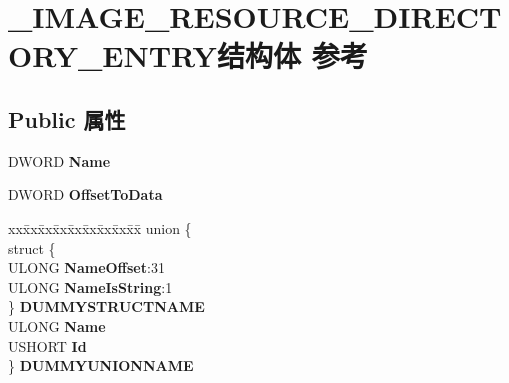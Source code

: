 \hypertarget{struct___i_m_a_g_e___r_e_s_o_u_r_c_e___d_i_r_e_c_t_o_r_y___e_n_t_r_y}{}\section{\+\_\+\+I\+M\+A\+G\+E\+\_\+\+R\+E\+S\+O\+U\+R\+C\+E\+\_\+\+D\+I\+R\+E\+C\+T\+O\+R\+Y\+\_\+\+E\+N\+T\+R\+Y结构体 参考}
\label{struct___i_m_a_g_e___r_e_s_o_u_r_c_e___d_i_r_e_c_t_o_r_y___e_n_t_r_y}
\subsection*{Public 属性}
\begin{DoxyCompactItemize}
\item 
\mbox{\label{struct___i_m_a_g_e___r_e_s_o_u_r_c_e___d_i_r_e_c_t_o_r_y___e_n_t_r_y_ad22f8c3d4789a1c9855d23a72243504e}} 
D\+W\+O\+RD {\bfseries Name}
\item 
\mbox{\label{struct___i_m_a_g_e___r_e_s_o_u_r_c_e___d_i_r_e_c_t_o_r_y___e_n_t_r_y_a3a4cd9e34d34c8cc2a6eb613fde7509a}} 
D\+W\+O\+RD {\bfseries Offset\+To\+Data}
\item 
\mbox{\label{struct___i_m_a_g_e___r_e_s_o_u_r_c_e___d_i_r_e_c_t_o_r_y___e_n_t_r_y_ac9631ba0261ffad2d16caf9e37be80c1}} 
\begin{tabbing}
xx\=xx\=xx\=xx\=xx\=xx\=xx\=xx\=xx\=\kill
union \{\\
\>struct \{\\
\>\>ULONG {\bfseries NameOffset}:31\\
\>\>ULONG {\bfseries NameIsString}:1\\
\>\} {\bfseries DUMMYSTRUCTNAME}\\
\>ULONG {\bfseries Name}\\
\>USHORT {\bfseries Id}\\
\} {\bfseries DUMMYUNIONNAME}\\


\end{tabbing}
\end{DoxyCompactItemize}
